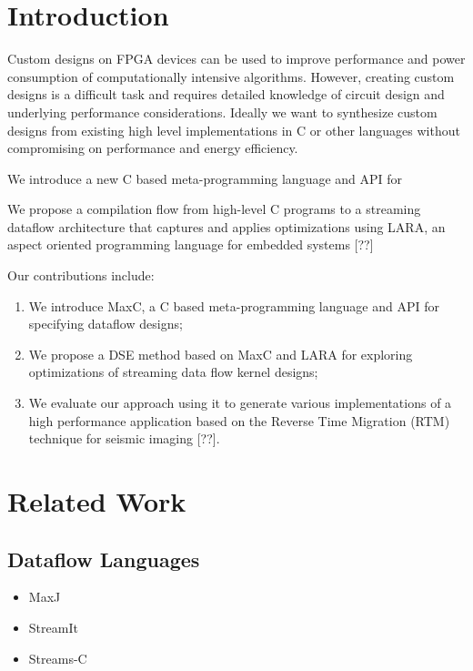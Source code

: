 \section{Introduction}

 Custom designs on FPGA devices can be used to improve performance and
power consumption of computationally intensive algorithms. However,
creating custom designs is a difficult task and requires detailed
knowledge of circuit design and underlying performance
considerations. Ideally we want to synthesize custom designs from
existing high level implementations in C or other languages without
compromising on performance and energy efficiency.

We introduce a new C based meta-programming language and API for


We propose a compilation flow from high-level C programs to a
streaming dataflow architecture that captures and applies
optimizations using LARA, an aspect oriented programming language for
embedded systems [??]

Our contributions include:
\begin{enumerate}

\item We introduce MaxC, a C based meta-programming language and API
  for specifying dataflow designs;

\item We propose a DSE method based on MaxC and LARA for exploring
  optimizations of streaming data flow kernel designs;

\item We evaluate our approach using it to generate various
  implementations of a high performance application based on the
  Reverse Time Migration (RTM) technique for seismic imaging [??].

\end{enumerate}

\section{Related Work}

\subsection{Dataflow Languages}
\begin{itemize}

\item MaxJ
\item StreamIt
\item Streams-C


\end{itemize}


